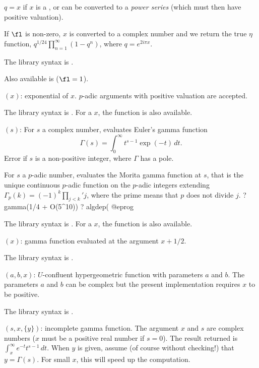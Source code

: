 \item $q = x$ if $x$ is a , or can be converted to a
\emph{power series} (which must then have positive valuation).

If $\fl$ is non-zero, $x$ is converted to a complex number and we return the
true $\eta$ function, $q^{1/24}\prod_{n=1}^\infty(1-q^n)$,
where $q = e^{2i\pi x}$.

The library syntax is .

Also available is  ($\fl=1$).

$(x)$: \label{se:exp}exponential of $x$.
$p$-adic arguments with positive valuation are accepted.

The library syntax is .
For a  $x$, the function
 is also available.

$(s)$: \label{se:gamma}For $s$ a complex number, evaluates Euler's gamma
function 
$$\Gamma(s)=\int_0^\infty t^{s-1}\exp(-t)\,dt.$$
Error if $s$ is a non-positive integer, where $\Gamma$ has a pole.

For $s$ a $p$-adic number, evaluates the Morita gamma function at $s$, that
is the unique continuous $p$-adic function on the $p$-adic integers
extending $\Gamma_p(k)=(-1)^k \prod_{j<k}'j$, where the prime means that $p$
does not divide $j$.
\bprog
? gamma(1/4 + O(5^10))
? algdep(%
@eprog

The library syntax is .
For a  $x$, the function
 is also available.

$(x)$: \label{se:gammah}gamma function evaluated at the argument $x+1/2$.

The library syntax is .

$(a,b,x)$: \label{se:hyperu}$U$-confluent hypergeometric function with
parameters $a$ and $b$. The parameters $a$ and $b$ can be complex but
the present implementation requires $x$ to be positive.

The library syntax is .

$(s,x,\{y\})$: \label{se:incgam}incomplete gamma function. The argument $x$
and $s$ are complex numbers ($x$ must be a positive real number if $s = 0$).
The result returned is $\int_x^\infty e^{-t}t^{s-1}\,dt$. When $y$ is given,
assume (of course without checking!) that $y=\Gamma(s)$. For small $x$, this
will speed up the computation.

